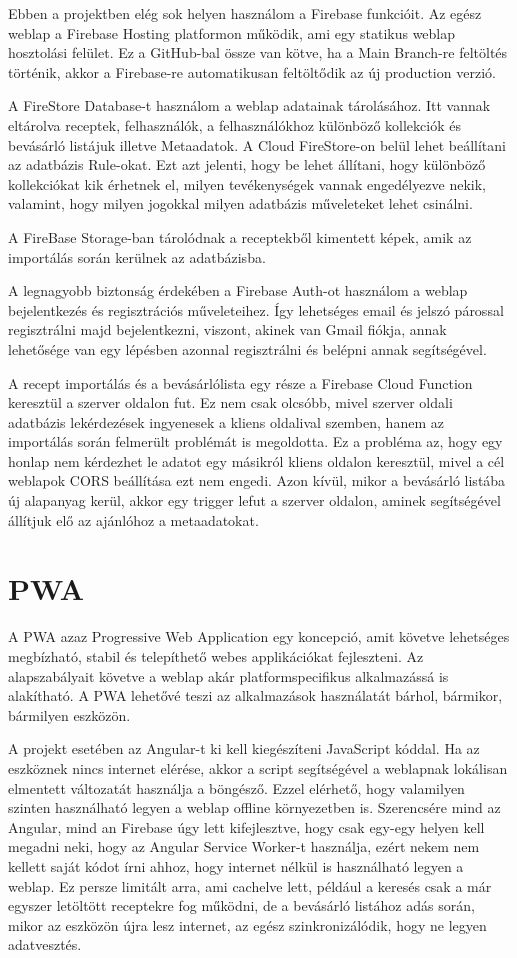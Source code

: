 \documentclass[12pt]{report}
\theoremstyle{definition}
\begin{document}
Ebben a projektben elég sok helyen használom a Firebase funkcióit. 
Az egész weblap a Firebase Hosting platformon működik, ami egy statikus weblap hosztolási felület. 
Ez a GitHub-bal össze van kötve, ha a Main Branch-re feltöltés történik, akkor a Firebase-re automatikusan feltöltődik az új production verzió.

A FireStore Database-t használom a weblap adatainak tárolásához. 
Itt vannak eltárolva  receptek, felhasználók, a felhasználókhoz különböző kollekciók és bevásárló listájuk illetve \gls{Metaadatok}. 
A Cloud FireStore-on belül lehet beállítani az adatbázis Rule-okat. 
Ezt azt jelenti, hogy be lehet állítani, hogy különböző kollekciókat kik érhetnek el, milyen tevékenységek vannak engedélyezve nekik, valamint, hogy milyen jogokkal milyen adatbázis műveleteket lehet csinálni. 

A FireBase Storage-ban tárolódnak a receptekből kimentett képek, amik az importálás során kerülnek az adatbázisba.

A legnagyobb biztonság érdekében a Firebase Auth-ot használom a weblap bejelentkezés és regisztrációs műveleteihez. 
Így lehetséges email és jelszó párossal regisztrálni majd bejelentkezni, viszont, akinek van Gmail fiókja, annak lehetősége van egy lépésben azonnal regisztrálni és belépni annak segítségével.

A recept importálás és a bevásárlólista egy része a Firebase Cloud Function keresztül a szerver oldalon fut. 
Ez nem csak olcsóbb, mivel szerver oldali adatbázis lekérdezések ingyenesek a kliens oldalival szemben, hanem az importálás során felmerült problémát is megoldotta. 
Ez a  probléma az, hogy egy honlap nem kérdezhet le adatot egy másikról kliens oldalon keresztül, mivel a cél weblapok CORS beállítása ezt nem engedi. 
Azon kívül, mikor a bevásárló listába új alapanyag kerül, akkor egy trigger lefut a szerver oldalon, aminek segítségével állítjuk elő az ajánlóhoz a metaadatokat.


\section{PWA}
A PWA azaz Progressive Web Application egy koncepció, amit követve lehetséges megbízható, stabil és telepíthető webes applikációkat fejleszteni. 
Az alapszabályait követve a weblap akár platformspecifikus alkalmazássá is alakítható. A PWA lehetővé teszi az alkalmazások használatát bárhol, bármikor, bármilyen eszközön. 

A projekt esetében az Angular-t ki kell kiegészíteni JavaScript kóddal. 
Ha az eszköznek nincs internet elérése, akkor a script segítségével a weblapnak lokálisan elmentett változatát használja a böngésző. 
Ezzel elérhető, hogy valamilyen szinten használható legyen a weblap offline környezetben is. Szerencsére mind az Angular, mind an Firebase úgy lett kifejlesztve, hogy csak egy-egy helyen kell megadni neki, hogy az Angular Service Worker-t használja, ezért nekem nem kellett saját kódot írni ahhoz, hogy internet nélkül is használható legyen a weblap. Ez persze limitált arra, ami cachelve lett, például a keresés csak a már egyszer letöltött receptekre fog működni, de a bevásárló listához adás során, mikor az eszközön újra lesz internet, az egész szinkronizálódik, hogy ne legyen adatvesztés.
\end{document}
